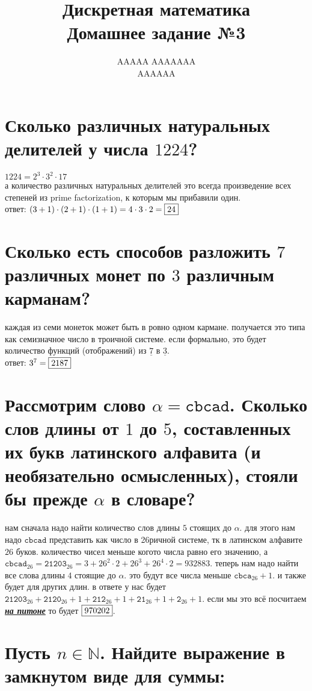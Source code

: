 \documentclass{article}
\title{Дискретная математика \\ Домашнее задание №3}
\author{AAAAA AAAAAAA \\ AAAAAA}
\newcommand{\N}{\mathbb{N}}
\newcommand{\range}{\underline}
\begin{document}
  \maketitle

  \section{Сколько различных натуральных делителей у числа $1224$?}
  $1224 = 2^3 \cdot 3^2 \cdot 17$ \\
  а количество различных натуральных делителей это всегда\cite{divisor} произведение всех степеней из prime factorization,
  к которым мы прибавили один. \\
  ответ: $(3+1)\cdot(2+1)\cdot(1+1) = 4\cdot3\cdot2 = \fbox{24}$

  \section{Сколько есть способов разложить $7$ различных монет по $3$ различным карманам?}
  каждая из семи монеток может быть в ровно одном кармане. получается это типа как семизначное число в троичной системе.
  если формально, это будет количество функций (отображений) из $\range{7}$ в $\range{3}$. \\
  ответ: $3^7 = \fbox{2187}$

  \section{Рассмотрим слово $\alpha = \texttt{cbcad}$. Сколько слов длины от $1$ до $5$, составленных их букв латинского алфавита (и необязательно осмысленных), стояли бы прежде $\alpha$ в словаре?}
  нам сначала надо найти количество слов длины $5$ стоящих до $\alpha$.
  для этого нам надо $\texttt{cbcad}$ представить как число в 26ричной системе, тк в латинском алфавите $26$ буков.
  количество чисел меньше когото числа равно его значению,
  а $\texttt{cbcad}_{26} = \texttt{21203}_{26} = 3+26^2\cdot2+26^3+26^4\cdot2 = 932883$.
  теперь нам надо найти все слова длины $4$ стоящие до $\alpha$. это будут все числа меньше $\texttt{cbca}_{26}+1$.
  и также будет для других длин.
  в ответе у нас будет $ \texttt{21203}_{26} + \texttt{2120}_{26}+1 + \texttt{212}_{26}+1 + \texttt{21}_{26}+1 + \texttt{2}_{26}+1$.
  если мы это всё посчитаем \underline{\textit{\textbf{\Large на питоне}}} то будет $\fbox{970202}$.

  \section{Пусть $n \in \N$. Найдите выражение в замкнутом виде для суммы:}
\end{document}
